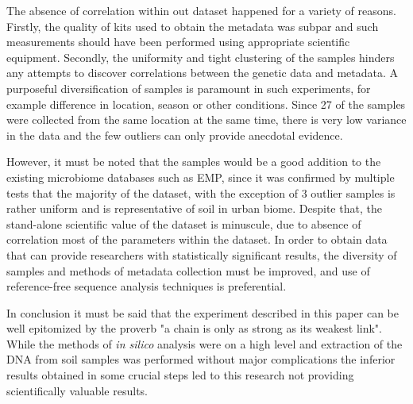\documentclass[12pt,twocolumn]{article} %
\begin{document}
\par
The absence of correlation within out dataset happened for a variety of reasons. Firstly, the quality of kits used to obtain the metadata was subpar and such measurements should have been performed using appropriate scientific equipment. Secondly, the uniformity and tight clustering of the samples hinders any attempts to discover correlations between the genetic data and metadata. A purposeful diversification of samples is paramount in such experiments, for example difference in location, season or other conditions. Since 27 of the samples were collected from the same location at the same time, there is very low variance in the data and the few outliers can only provide anecdotal evidence.
\par
However, it must be noted that the samples would be a good addition to the existing microbiome databases such as EMP, since it was confirmed by multiple tests that the majority of the dataset, with the exception of 3 outlier samples is rather uniform and is representative of soil in urban biome. Despite that, the stand-alone scientific value of the dataset is minuscule, due to absence of correlation most of the parameters within the dataset. In order to obtain data that can provide researchers with statistically significant results, the diversity of samples and methods of metadata collection must be improved, and use of reference-free sequence analysis techniques is preferential.
\par
In conclusion it must be said that the experiment described in this paper can be well epitomized by the proverb "a chain is only as strong as its weakest link". While the methods of \textit{in silico} analysis were on a high level and extraction of the DNA from soil samples was performed without major complications the inferior results obtained in some crucial steps led to this research not providing scientifically valuable results. 


\end{document}
